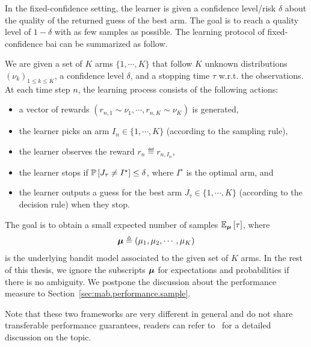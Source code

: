 In the fixed-confidence setting, the learner is given a confidence level/risk $\delta$ about the quality of the returned guess of the best arm. The goal is to reach a quality level of $1-\delta$ with as few samples as possible. The learning protocol of fixed-confidence \gls{bai} can be summarized as follow.

\begin{definition}\label{def:mab.bai_confidence}
\begin{leftbar}[defnbar]
	We are given a set of $K$ arms $\{1,\cdots,K\}$ that follow $K$ unknown distributions $(\nu_k)_{1 \leq k \leq K}$, a confidence level $\delta$, and a stopping time $\tau$ w.r.t. the observations. At each time step $n$, the learning process consists of the following actions:
\begin{itemize}
	\item a vector of rewards $(r_{n,1} \sim \nu_1, \cdots, r_{n,K} \sim \nu_K)$ is generated,
	\item the learner picks an arm $I_n \in \{1,\cdots,K\}$ (according to the sampling rule),
	\item the learner observes the reward $r_n \eqdef r_{n,I_n}$,
	\item the learner stops if $\mathbb{P}\left[J_{\tau}\neq I^\star\right] \leq \delta$, where $I^\star$ is the optimal arm, and
	\item the learner outputs a guess for the best arm $J_\tau \in \{1,\cdots,K\}$ (according to the decision rule) when they stop.
\end{itemize}
\end{leftbar}
\end{definition}

The goal is to obtain a small expected number of samples $\mathbb{E}_{{\boldsymbol \mu}}\left[\tau\right]$, where 
\[
    {\boldsymbol \mu}\triangleq(\mu_1,\mu_2,\cdots,\mu_K)
\]
is the underlying bandit model associated to the given set of $K$ arms. In the rest of this thesis, we ignore the subscripts ${\boldsymbol \mu}$ for expectations and probabilities if there is no ambiguity. We postpone the discussion about the performance measure to Section~\ref{sec:mab.performance.sample}.

\begin{remark}
\begin{leftbar}[remarkbar]\label{remark:mab.two_frameworks}
Note that these two frameworks are very different in general and do not share transferable performance guarantees, readers can refer to~\cite{carpentier2016budget} for a detailed discussion on the topic.
\end{leftbar}
\end{remark}

